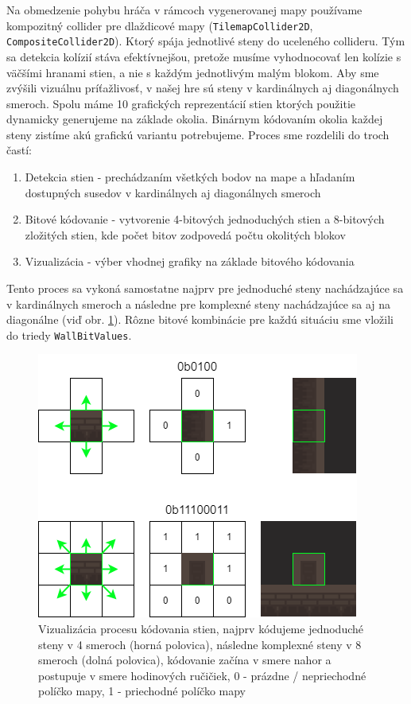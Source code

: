 Na obmedzenie pohybu hráča v rámcoch vygenerovanej mapy používame kompozitný collider pre dlaždicové mapy (\verb|Tilemap|\verb|Collider|\verb|2D|, \verb|Composite|\verb|Collider|\verb|2D|). Ktorý spája jednotlivé steny do uceleného collideru. Tým sa detekcia kolízií stáva efektívnejšou, pretože musíme vyhodnocovať len kolízie s väčšími hranami stien, a nie s každým jednotlivým malým blokom. Aby sme zvýšili vizuálnu príťažlivosť, v našej hre sú steny v kardinálnych aj diagonálnych smeroch. Spolu máme 10 grafických reprezentácií stien ktorých použitie dynamicky generujeme na základe okolia. Binárnym kódovaním okolia každej steny zistíme akú grafickú variantu potrebujeme. Proces sme rozdelili do troch častí:

\begin{enumerate}
\item Detekcia stien - prechádzaním všetkých bodov na mape a hľadaním dostupných susedov v kardinálnych aj diagonálnych smeroch
\item Bitové kódovanie - vytvorenie 4-bitových jednoduchých stien a 8-bitových zložitých stien, kde počet bitov zodpovedá počtu okolitých blokov
\item Vizualizácia - výber vhodnej grafiky na základe bitového kódovania
\end{enumerate}

Tento proces sa vykoná samostatne najprv pre jednoduché steny nachádzajúce sa v kardinálnych smeroch a následne pre komplexné steny nachádzajúce sa aj na diagonálne (viď obr. \ref{fig:bit-walls}). Rôzne bitové kombinácie pre každú situáciu sme vložili do triedy \verb|WallBitValues|.

\begin{figure} [H]
    \centering
    \includegraphics[width=0.6\linewidth]{obrazky-figures/bit-walls.png}
    \caption{Vizualizácia procesu kódovania stien, najprv kódujeme jednoduché steny v 4 smeroch (horná polovica), následne komplexné steny v 8 smeroch (dolná polovica), kódovanie začína v smere nahor a postupuje v smere hodinových ručičiek, 0 - prázdne / nepriechodné políčko mapy, 1 - priechodné políčko mapy}
    \label{fig:bit-walls}
\end{figure}


